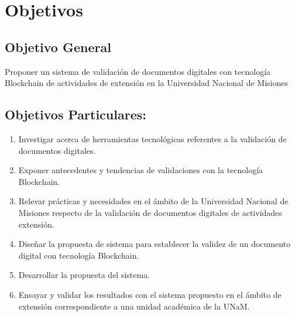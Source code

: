 \section{Objetivos}

\subsection{Objetivo General}
Proponer un sistema de validación de documentos digitales con 
tecnología  Blockchain  de actividades de extensión en la Universidad
 Nacional de Misiones

 \subsection{Objetivos Particulares:}
\begin{enumerate}
    \item Investigar acerca de herramientas tecnológicas referentes
    a la validación de documentos digitales.

    \item Exponer antecedentes y tendencias de validaciones con la tecnología 
    Blockchain.

    \item Relevar prácticas y necesidades en el ámbito de la 
    Universidad Nacional de Misiones respecto de la validación de 
    documentos digitales de actividades extensión. 

    
    \item Diseñar la propuesta de sistema para establecer la validez de un 
    documento digital con tecnología  Blockchain.
 
    \item Desarrollar  la propuesta del sistema. 
    
    \item Ensayar y validar  los resultados con el sistema propuesto en 
    el ámbito de extensión correspondiente a una unidad académica de la UNaM.
\end{enumerate}
